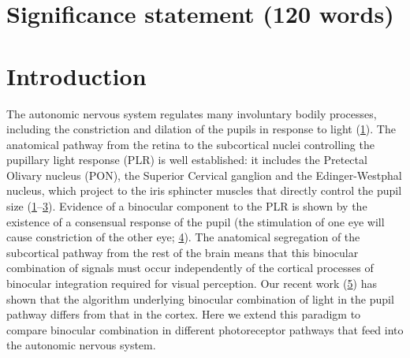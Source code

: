 \documentclass[
]{article}
\begin{document}
\hypertarget{significance-statement-120-words}{%
\section{Significance statement (120 words)}\label{significance-statement-120-words}}

\hypertarget{introduction}{%
\section{Introduction}\label{introduction}}

The autonomic nervous system regulates many involuntary bodily processes, including the constriction and dilation of the pupils in response to light (\protect\hyperlink{ref-McDougal2015}{1}). The anatomical pathway from the retina to the subcortical nuclei controlling the pupillary light response (PLR) is well established: it includes the Pretectal Olivary nucleus (PON), the Superior Cervical ganglion and the Edinger-Westphal nucleus, which project to the iris sphincter muscles that directly control the pupil size (\protect\hyperlink{ref-McDougal2015}{1}--\protect\hyperlink{ref-Wang2015}{3}). Evidence of a binocular component to the PLR is shown by the existence of a consensual response of the pupil (the stimulation of one eye will cause constriction of the other eye; \protect\hyperlink{ref-Wyatt1981}{4}). The anatomical segregation of the subcortical pathway from the rest of the brain means that this binocular combination of signals must occur independently of the cortical processes of binocular integration required for visual perception. Our recent work (\protect\hyperlink{ref-Segala2023}{5}) has shown that the algorithm underlying binocular combination of light in the pupil pathway differs from that in the cortex. Here we extend this paradigm to compare binocular combination in different photoreceptor pathways that feed into the autonomic nervous system.
\end{document}
